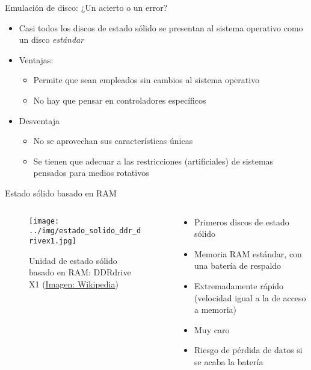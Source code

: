 \documentclass[presentation]{beamer}
\begin{document}
\begin{frame}[label={sec:org4e41d88}]{Emulación de disco: ¿Un acierto o un error?}
\begin{itemize}
\item Casi todos los discos de estado sólido se presentan al sistema
operativo como un disco \emph{estándar}
\item Ventajas:
\begin{itemize}
\item Permite que sean empleados sin cambios al sistema operativo
\item No hay que pensar en controladores específicos
\end{itemize}
\item Desventaja
\begin{itemize}
\item No se aprovechan sus características únicas
\item Se tienen que adecuar a las restricciones (artificiales) de
sistemas pensados para medios rotativos
\end{itemize}
\end{itemize}
\end{frame}

\begin{frame}[label={sec:org907cdce}]{Estado sólido basado en RAM}
\begin{columns} \begin{column}{0.4\textwidth}
\begin{figure}[htbp]
\centering
\texttt{[image: ../img/estado\_solido\_ddr\_drivex1.jpg]}
\caption{Unidad de estado sólido basado en RAM: DDRdrive X1 (\href{https://en.wikipedia.org/wiki/Solid-state\\\_drive}{Imagen: Wikipedia})}
\end{figure}
\end{column} \begin{column}{0.6\textwidth}
\begin{itemize}
\item Primeros discos de estado sólido
\item Memoria RAM estándar, con una batería de respaldo
\item Extremadamente rápido (velocidad igual a la de acceso a memoria)
\item Muy caro
\item Riesgo de pérdida de datos si se acaba la batería
\end{itemize}
\end{column} \end{columns}
\end{frame}
\end{document}

